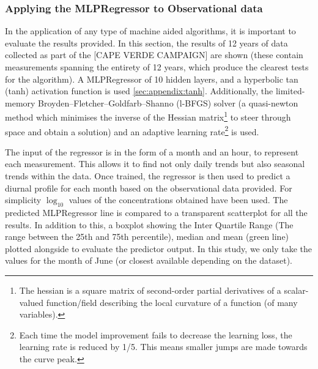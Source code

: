 \subsubsection{Applying the MLPRegressor to Observational data}
In the application of any type of machine aided algorithms, it is important to evaluate the results provided. In this section, the results of 12 years of data collected as part of the [CAPE VERDE CAMPAIGN] are shown (these contain measurements spanning the entirety of 12 years, which produce the clearest tests for the algorithm). A MLPRegressor of 10 hidden layers, and a hyperbolic tan (tanh) activation function is used \autoref{sec:appendix:tanh}. Additionally, the limited-memory Broyden–Fletcher–Goldfarb–Shanno (l-BFGS) solver (a quasi-newton method which minimises the inverse of the Hessian matrix\footnote{ The hessian is a square matrix of second-order partial derivatives of a scalar-valued function/field describing the local curvature of a function (of many variables).} to steer through space and obtain a solution) and an adaptive learning rate\footnote{Each time the model improvement fails to decrease the learning loss, the learning rate is reduced by 1/5. This means smaller jumps are made towards the curve peak. } is used. 

The input of the regressor is in the form of a month and an hour, to represent each measurement. This allows it to find not only daily trends but also seasonal trends within the data. Once trained, the regressor is then used to predict a diurnal profile for each month based on the observational data provided. For simplicity $\log_{10}$ values of the concentrations obtained have been used. The predicted MLPRegressor line is compared to a transparent scatterplot for all the results. In addition to this, a boxplot showing the Inter Quartile Range (The range between the 25th and 75th percentile), median and mean (green line) plotted alongside to evaluate the predictor output. In this study, we only take the values for the month of June (or closest available depending on the dataset). 

